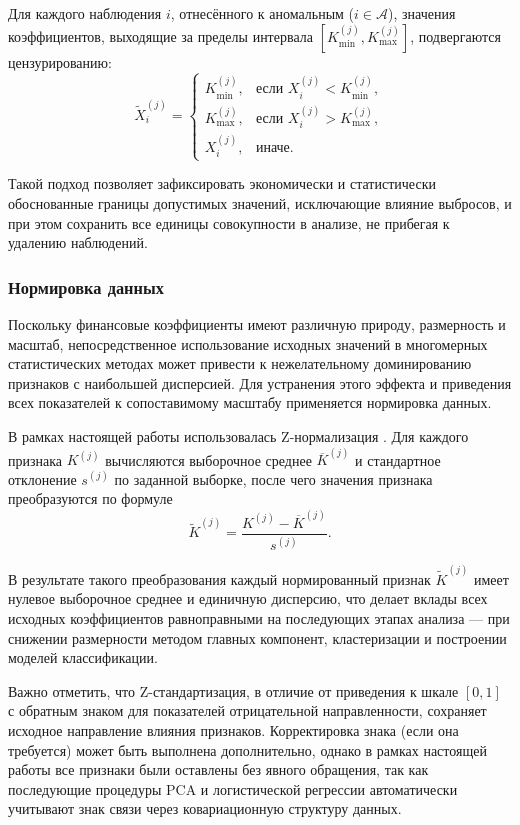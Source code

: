 \documentclass[14pt,a4paper]{extarticle}
\begin{document}
Для каждого наблюдения $i$, отнесённого к аномальным ($i \in \mathcal{A}$), значения коэффициентов, 
выходящие за пределы интервала $[K_{\min}^{(j)}, K_{\max}^{(j)}]$, подвергаются цензурированию:
\[
\tilde{X}_i^{(j)} = 
\begin{cases}
K_{\min}^{(j)}, & \text{если } X_i^{(j)} < K_{\min}^{(j)}, \\[4pt]
K_{\max}^{(j)}, & \text{если } X_i^{(j)} > K_{\max}^{(j)}, \\[4pt]
X_i^{(j)}, & \text{иначе}.
\end{cases}
\]

Такой подход \cite{malugin2013} позволяет зафиксировать экономически и статистически обоснованные границы 
допустимых значений, исключающие влияние выбросов, и при этом сохранить все единицы совокупности в анализе, 
не прибегая к удалению наблюдений.

\subsubsection{Нормировка данных}

Поскольку финансовые коэффициенты имеют различную природу, размерность и масштаб, 
непосредственное использование исходных значений в многомерных статистических методах 
может привести к нежелательному доминированию признаков с наибольшей дисперсией. 
Для устранения этого эффекта и приведения всех показателей к сопоставимому масштабу 
применяется нормировка данных.

В рамках настоящей работы использовалась Z-нормализация \cite{pedregosa2011}. Для каждого признака $K^{(j)}$ 
вычисляются выборочное среднее $\overline{K}^{(j)}$ и стандартное отклонение $s^{(j)}$ по 
заданной выборке, после чего значения признака преобразуются по формуле
\[
\widetilde{K}^{(j)} = \frac{K^{(j)} - \overline{K}^{(j)}}{s^{(j)}}.
\]

В результате такого преобразования каждый нормированный признак $\widetilde{K}^{(j)}$ имеет нулевое 
выборочное среднее и единичную дисперсию, что делает вклады всех исходных коэффициентов равноправными 
на последующих этапах анализа — при снижении размерности методом главных компонент, кластеризации и 
построении моделей классификации.

Важно отметить, что Z-стандартизация, в отличие от приведения к шкале $[0,1]$ с обратным знаком 
для показателей отрицательной направленности, сохраняет исходное направление влияния признаков. 
Корректировка знака (если она требуется) может быть выполнена дополнительно, однако в рамках настоящей 
работы все признаки были оставлены без явного обращения, так как последующие процедуры PCA и 
логистической регрессии автоматически учитывают знак связи через ковариационную структуру данных.
\end{document}
